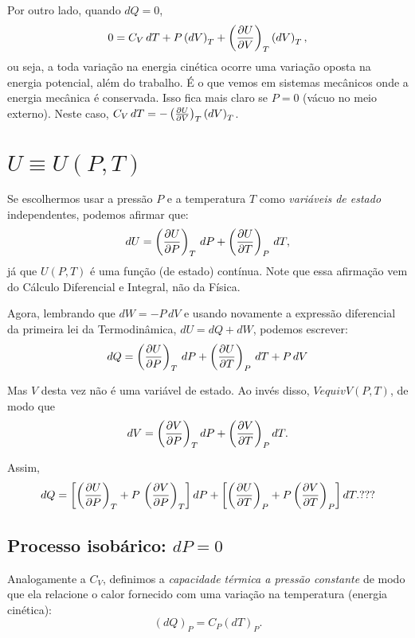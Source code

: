 \documentclass[a4paper,12pt]{scrartcl}
\begin{document}
  Por outro lado, quando $dQ = 0$,
  \begin{equation*}
  0 = C_V\, dT + P\left(dV\right)_T + \left(\frac{\partial U}{\partial V}\right)_{T}\left(dV\right)_T,
  \end{equation*}
  ou seja, a toda variação na energia cinética ocorre uma variação oposta na energia potencial, além do trabalho. É o que vemos em sistemas mecânicos onde a energia mecânica é conservada. Isso fica mais claro se $P = 0$ (vácuo no meio externo). Neste caso, $C_V\, dT = - \left(\frac{\partial U}{\partial V}\right)_{T}\left(dV\right)_T$.

  

  
\section{$U \equiv U(P,T)$}
  
  Se escolhermos usar a pressão $P$ e a temperatura $T$ como \emph{variáveis de estado} independentes, podemos afirmar que:
  \begin{equation}\label{eq:dU(P,T)}
  dU = \left(\frac{\partial U}{\partial P}\right)_{T}\, dP + \left(\frac{\partial U}{\partial T}\right)_{P}\, dT,
  \end{equation}
  já que $U(P,T)$ é uma função (de estado) contínua. Note que essa afirmação vem do Cálculo Diferencial e Integral, não da Física.
  
  Agora, lembrando que $dW = -P\, dV$ e usando novamente a expressão diferencial da primeira lei da Termodinâmica, $dU = dQ + dW$, podemos escrever:
  \begin{equation*}
  dQ = \left(\frac{\partial U}{\partial P}\right)_{T}\, dP + \left(\frac{\partial U}{\partial T}\right)_{P}\, dT + P\, dV
  \end{equation*}
  
  Mas $V$ desta vez não é uma variável de estado. Ao invés disso, $V equiv V(P,T)$, de modo que
  \begin{equation}
  dV = \left(\frac{\partial V}{\partial P}\right)_{T} dP + \left(\frac{\partial V}{\partial T}\right)_{P} dT.
  \end{equation}
  
  Assim,
  \begin{equation*}
  dQ = \left[\left(\frac{\partial U}{\partial P}\right)_{T} + P\, \left(\frac{\partial V}{\partial P}\right)_{T}\right] dP + \left[\left(\frac{\partial U}{\partial T}\right)_{P} + P \left(\frac{\partial V}{\partial T}\right)_{P}\right] dT. ???
  \end{equation*}

  

  \subsection*{Processo isobárico: $dP = 0$}
  
  Analogamente a $C_V$, definimos a \emph{capacidade térmica a pressão constante} de modo que ela relacione o calor fornecido com uma variação na temperatura (energia cinética):
  \begin{equation}
  \left(dQ\right)_P = C_P\left(dT\right)_P.
  \end{equation}
  
\end{document}
